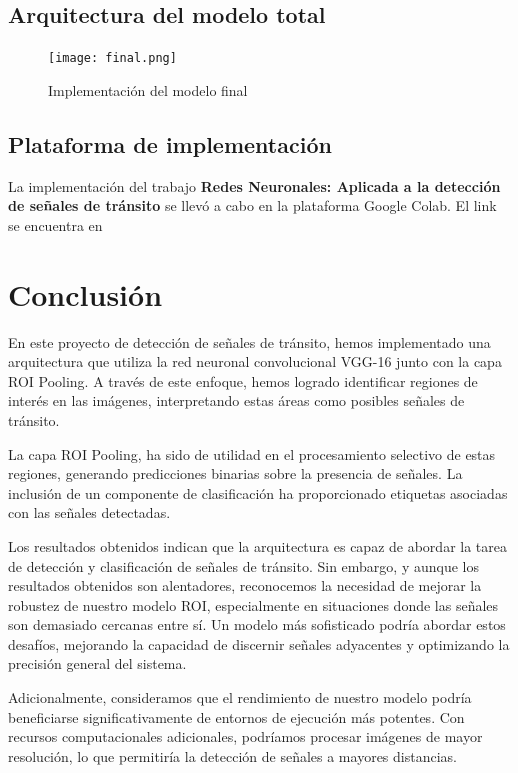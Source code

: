     \subsection{Arquitectura del modelo total}

    \begin{figure}[ht]
	    \centering
		\texttt{[image: final.png]}
		\caption{Implementación del modelo final}
	\end{figure}

 \vspace{0.5cm}

 \subsection{Plataforma de implementación}
 La implementación del trabajo \textbf{Redes Neuronales: Aplicada a la detección de señales de tránsito} se llevó a cabo en la plataforma Google Colab. El link se encuentra en \cite{colab}

\newpage
\section{Conclusión}
En este proyecto de detección de señales de tránsito, hemos implementado una arquitectura que utiliza la red neuronal convolucional VGG-16 junto con la capa ROI Pooling. A través de este enfoque, hemos logrado identificar regiones de interés en las imágenes, interpretando estas áreas como posibles señales de tránsito.

La capa ROI Pooling, ha sido de utilidad en el procesamiento selectivo de estas regiones, generando predicciones binarias sobre la presencia de señales. La inclusión de un componente de clasificación ha proporcionado etiquetas asociadas con las señales detectadas.

Los resultados obtenidos indican que la arquitectura es capaz de abordar la tarea de detección y clasificación de señales de tránsito. Sin embargo, y aunque los resultados obtenidos son alentadores, reconocemos la necesidad de mejorar la robustez de nuestro modelo ROI, especialmente en situaciones donde las señales son demasiado cercanas entre sí. Un modelo más sofisticado podría abordar estos desafíos, mejorando la capacidad de discernir señales adyacentes y optimizando la precisión general del sistema.

Adicionalmente, consideramos que el rendimiento de nuestro modelo podría beneficiarse significativamente de entornos de ejecución más potentes. Con recursos computacionales adicionales, podríamos procesar imágenes de mayor resolución, lo que permitiría la detección de señales a mayores distancias.